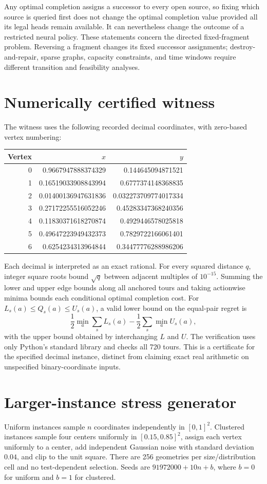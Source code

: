 Any optimal completion assigns a successor to every open source, so fixing
which source is queried first does not change the optimal completion value
provided all its legal heads remain available. It can nevertheless change
the outcome of a restricted neural policy. These statements concern the
directed fixed-fragment problem. Reversing a fragment changes its fixed
successor assignments; destroy-and-repair, sparse graphs, capacity constraints,
and time windows require different transition and feasibility analyses.

\section{Numerically certified witness}
The witness uses the following recorded decimal coordinates, with zero-based
vertex numbering:
\begin{center}\small
\begin{tabular}{rrr}\toprule
Vertex & $x$ & $y$\\\midrule
0 & 0.9667947888374329 & 0.144645094871521\\
1 & 0.16519033908843994 & 0.6777374148368835\\
2 & 0.01400136947631836 & 0.032273709774017334\\
3 & 0.27172255516052246 & 0.45283347368240356\\
4 & 0.11830371618270874 & 0.4929446578025818\\
5 & 0.49647223949432373 & 0.7829722166061401\\
6 & 0.6254234313964844 & 0.34477776288986206\\\bottomrule
\end{tabular}\end{center}
Each decimal is interpreted as an exact rational. For every squared distance
$q$, integer square roots bound $\sqrt q$ between adjacent multiples of
$10^{-15}$. Summing the lower and upper edge bounds along all anchored tours
and taking actionwise minima bounds each conditional optimal completion cost.
For $L_s(a)\leq Q_s(a)\leq U_s(a)$, a valid lower bound on the equal-pair
regret is
\[
\frac12\min_a\sum_s L_s(a)-\frac12\sum_s\min_a U_s(a),
\]
with the upper bound obtained by interchanging $L$ and $U$.
The verification uses only Python's standard library and checks all 720 tours.
This is a certificate for the specified decimal instance, distinct from
claiming exact real arithmetic on unspecified binary-coordinate inputs.

\section{Larger-instance stress generator}
Uniform instances sample $n$ coordinates independently in $[0,1]^2$.
Clustered instances sample four centers uniformly in $[0.15,0.85]^2$, assign
each vertex uniformly to a center, add independent Gaussian noise with
standard deviation $0.04$, and clip to the unit square. There are 256
geometries per size/distribution cell and no test-dependent selection.
Seeds are $91972000+10n+b$, where $b=0$ for uniform and $b=1$ for clustered.

